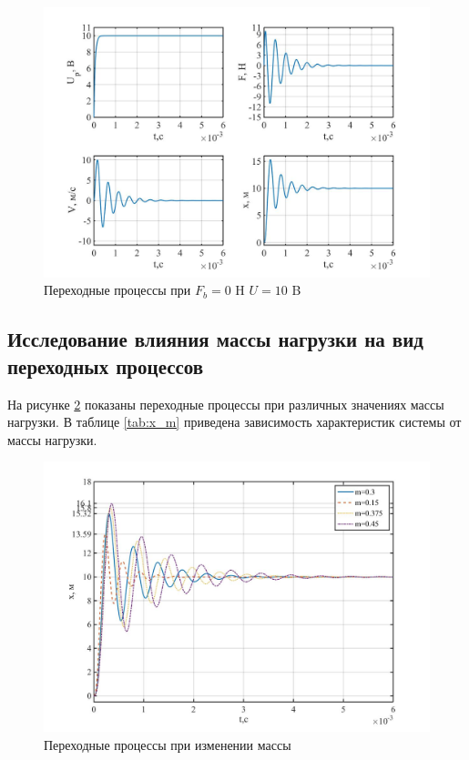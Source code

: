 \documentclass[a4paper, 12pt]{article}
\begin{document}
\begin{figure}[h!]
	\centering
	\includegraphics[width = 0.65\textheight]{data/begin}
	\caption{Переходные процессы при $F_b=0$ H $U=10$ B}
	\label{begin}
\end{figure}

\newpage

\begin{center}
	\section{Исследование влияния массы нагрузки на вид переходных процессов}
\end{center}\par

На рисунке \ref{m_x} показаны переходные процессы при различных значениях массы нагрузки. В таблице \ref{tab:x_m} приведена зависимость  характеристик системы от массы нагрузки.

\begin{figure}[h!]
	\centering
	\includegraphics[width = 0.65\textheight]{data/m_x}
	\caption{Переходные процессы при изменении массы}
	\label{m_x}
\end{figure}
\end{document}

